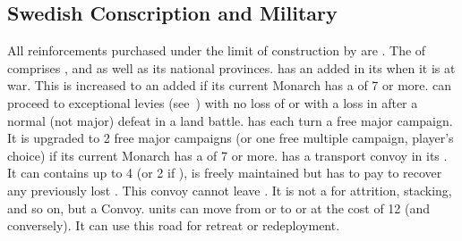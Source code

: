\subsection{Swedish Conscription and Military}
\label{chSpecific:Sweden:Conscription}
\aparag All reinforcements purchased under the limit of construction by
\SUE are .
\aparag The  of \SUE comprises
,  and  as well as
its national provinces.
\aparag \SUE has an added \ARMY\facemoins in its 
when it is at war. This is increased to an added \ARMY\faceplus if its
current Monarch has a \MIL of 7 or more.
\aparag \SUE can proceed to exceptional levies
(see~) with no loss of \STAB
or with a loss in \STAB after a normal (not major) defeat in a land battle.
\aparag \SUE has each turn a free major campaign. It is upgraded to 
2 free major campaigns (or one free multiple campaign, player's choice) 
if its current Monarch has a \MIL of 7 or more.
 \SUE has a transport convoy in its
. It can contains up to 4 \NTD (or 2 \NTD if
\facemoins), is freely maintained but \SUE has to pay to recover any
previously lost \NTD. This convoy cannot leave . It is
not a \FLEET for attrition, stacking, and so on, but a Convoy.
 \SUE units can move from
 or  to  or
 at the cost of 12 \MP (and conversely).  It can
use this road for retreat or redeployment.

